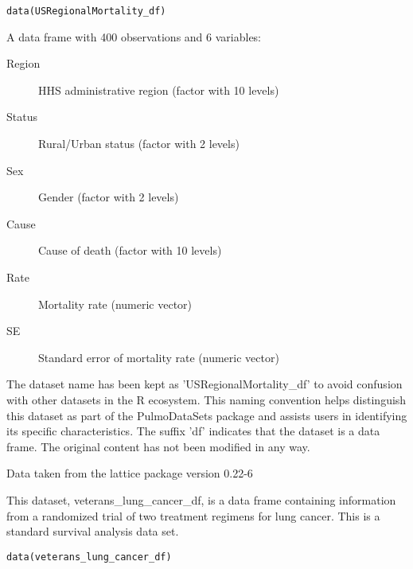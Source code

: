 \documentclass[a4paper]{book}
\begin{document}
%
\begin{Usage}
\begin{verbatim}
data(USRegionalMortality_df)
\end{verbatim}
\end{Usage}
%
\begin{Format}
A data frame with 400 observations and 6 variables:
\begin{description}

\item[Region] HHS administrative region (factor with 10 levels)
\item[Status] Rural/Urban status (factor with 2 levels)
\item[Sex] Gender (factor with 2 levels)
\item[Cause] Cause of death (factor with 10 levels)
\item[Rate] Mortality rate (numeric vector)
\item[SE] Standard error of mortality rate (numeric vector)

\end{description}

\end{Format}
%
\begin{Details}
The dataset name has been kept as 'USRegionalMortality\_df' to avoid confusion with other datasets
in the R ecosystem. This naming convention helps distinguish this dataset as part of the
PulmoDataSets package and assists users in identifying its specific characteristics.
The suffix 'df' indicates that the dataset is a data frame. The original content has not been modified
in any way.
\end{Details}
%
\begin{Source}
Data taken from the lattice package version 0.22-6
\end{Source}
%
\begin{Description}
This dataset, veterans\_lung\_cancer\_df, is a data frame containing information from a randomized trial
of two treatment regimens for lung cancer. This is a standard survival analysis data set.
\end{Description}
%
\begin{Usage}
\begin{verbatim}
data(veterans_lung_cancer_df)
\end{verbatim}
\end{Usage}
%
\end{document}
